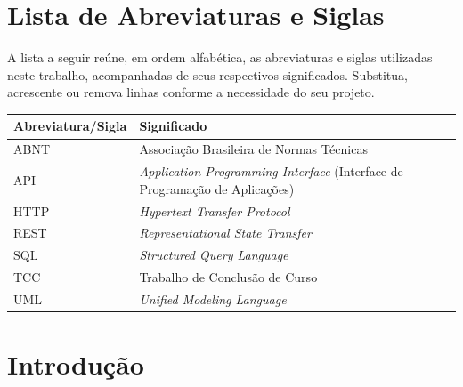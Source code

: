 \documentclass[
    12pt,                %
    openright,           %
    oneside,             %
    a4paper,             %
    english,             %
    brazil               %
]{abntex2}
\begin{document}
\chapter*{Lista de Abreviaturas e Siglas}

\noindent A lista a seguir reúne, em ordem alfabética, as abreviaturas e siglas utilizadas neste trabalho, acompanhadas de seus respectivos significados. Substitua, acrescente ou remova linhas conforme a necessidade do seu projeto.

\vspace{\onelineskip}

\begin{center}
\begin{tabular}{@{}p{3.2cm}p{}@{}}
\toprule
\textbf{Abreviatura/Sigla} & \textbf{Significado} \\
\midrule
ABNT  & Associação Brasileira de Normas Técnicas \\
API   & \textit{Application Programming Interface} (Interface de Programação de Aplicações) \\
HTTP  & \textit{Hypertext Transfer Protocol} \\
REST  & \textit{Representational State Transfer} \\
SQL   & \textit{Structured Query Language} \\
TCC   & Trabalho de Conclusão de Curso \\
UML   & \textit{Unified Modeling Language} \\
\bottomrule
\end{tabular}
\end{center}

\cleardoublepage

\tableofcontents*
\cleardoublepage

\textual

\chapter{Introdução}
\label{cap:introducao}
\end{document}
